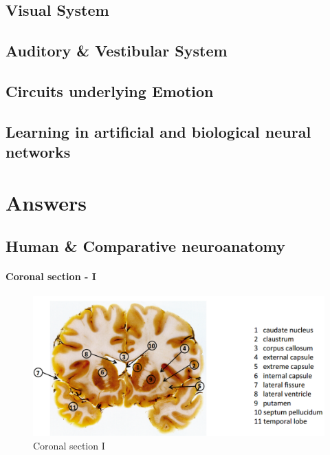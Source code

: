 \documentclass[12pt,article,oneside,a4paper]{memoir}
\begin{document}
\subsection{Visual System}
\subsection{Auditory \& Vestibular System}
\subsection{Circuits underlying Emotion}
\subsection{Learning in artificial and biological neural networks}

\section{Answers}
\subsection{Human \& Comparative neuroanatomy}

\paragraph{Coronal section - I}
\begin{figure}[H]
	\centering
  	\includegraphics[width=\linewidth]{imgs/coronal-section-I-answer.png}
	\caption{Coronal section I}
  	\label{fig:coronalSectionI}
\end{figure}
\end{document}
